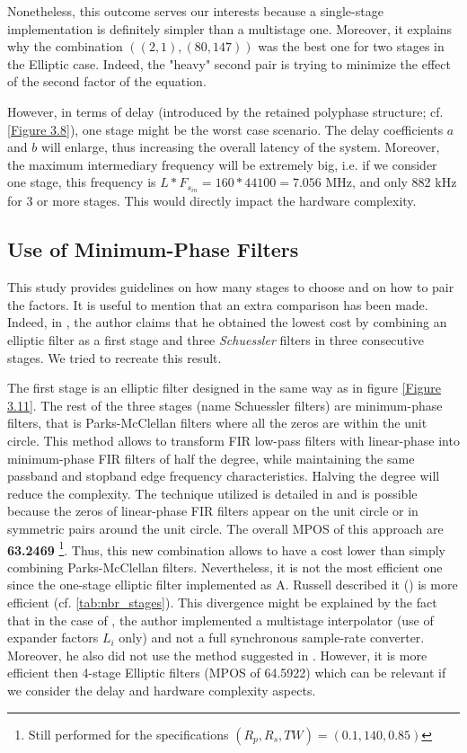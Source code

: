  Nonetheless, this outcome serves our interests because a single-stage implementation is definitely simpler than a multistage one. Moreover, it explains why the combination $((2,1),(80,147))$ was the best one for two stages in the Elliptic case. Indeed, the "heavy" second pair is trying to minimize the effect of the second factor of the equation. 
 
 However, in terms of delay (introduced by the retained polyphase structure; cf. \ref{Figure 3.8}), one stage might be the worst case scenario. The delay coefficients $a$ and $b$ will enlarge, thus increasing the overall latency of the system. Moreover, the maximum intermediary frequency will be extremely big, i.e. if we consider one stage, this frequency is $L*F_{s_{in}} = 160*44100 = 7.056 \text{ MHz}$, and only 882 kHz for 3 or more stages. This would directly impact the hardware complexity. 


\subsection{Use of Minimum-Phase Filters}

This study provides guidelines on how many stages to choose and on how to pair the factors. It is useful to mention that an extra comparison has been made. Indeed, in \cite{turek}, the author claims that he obtained the lowest cost by combining an elliptic filter as a first stage and three \textit{Schuessler} filters in three consecutive stages. We tried to recreate this result. 

The first stage is an elliptic filter designed in the same way as in figure \ref{Figure 3.11}. The rest of the three stages (name Schuessler filters) are minimum-phase filters, that is Parks-McClellan filters where all the zeros are within the unit circle. This method allows to transform FIR low-pass filters with linear-phase into minimum-phase FIR filters of half the degree, while maintaining the same passband and stopband edge frequency characteristics. Halving the degree will reduce the complexity. The technique utilized is detailed in \cite{turek} and is possible because the zeros of linear-phase FIR filters appear on the unit circle or in symmetric pairs around the unit circle. The overall MPOS of this approach are \textbf{63.2469} \footnote{Still performed for the specifications $(R_p, R_s, TW) = (0.1, 140, 0.85)$}. Thus, this new combination allows to have a cost lower than simply combining Parks-McClellan filters. Nevertheless, it is not the most efficient one since the one-stage elliptic filter implemented as A. Russell described it (\cite{russell}) is more efficient (cf. \ref{tab:nbr_stages}). This divergence might be explained by the fact that in the case of \cite{turek}, the author implemented a multistage interpolator (use of expander factors $L_i$ only) and not a full synchronous sample-rate converter. Moreover, he also did not use the method suggested in \cite{russell}. However, it is more efficient then 4-stage Elliptic filters (MPOS of 64.5922) which can be relevant if we consider the delay and hardware complexity aspects.


